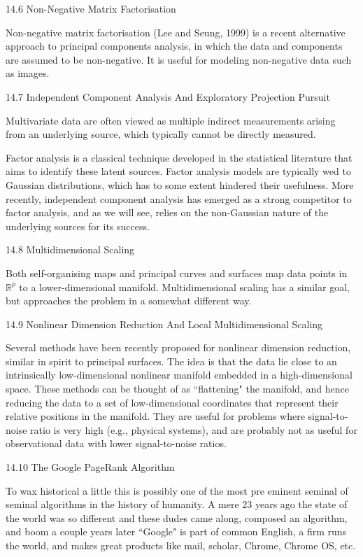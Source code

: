 14.6 Non-Negative Matrix Factorisation

Non-negative matrix factorisation (Lee and Seung, 1999) is a recent alternative approach to principal components analysis, in which the data and components are assumed to be non-negative. It is useful for modeling non-negative data such as images.

14.7 Independent Component Analysis And Exploratory Projection Pursuit

Multivariate data are often viewed as multiple indirect measurements arising from an underlying source, which typically cannot be directly measured.

Factor analysis is a classical technique developed in the statistical literature that aims to identify these latent sources. Factor analysis models are typically wed to Gaussian distributions, which has to some extent hindered their usefulness. More recently, independent component analysis has emerged as a strong competitor to factor analysis, and as we will see, relies on the non-Gaussian nature of the underlying sources for its success.

14.8 Multidimensional Scaling

Both self-organising maps and principal curves and surfaces map data points in $\mathbb{R}^p$ to a lower-dimensional manifold. Multidimensional scaling has a similar goal, but approaches the problem in a somewhat different way.

14.9 Nonlinear Dimension Reduction And Local Multidimensional Scaling

Several methods have been recently proposed for nonlinear dimension reduction, similar in spirit to principal surfaces. The idea is that the data lie close to an intrinsically low-dimensional nonlinear manifold embedded in a high-dimensional space. These methods can be thought of as ``flattening" the manifold, and hence reducing the data to a set of low-dimensional coordinates that represent their relative positions in the manifold. They are useful for problems where signal-to-noise ratio is very high (e.g., physical systems), and are probably not as useful for observational data with lower signal-to-noise ratios.

14.10 The Google PageRank Algorithm

To wax historical a little this is possibly one of the most pre eminent seminal of seminal algorithms in the history of humanity. A mere $23$ years ago the state of the world was so different and these dudes came along, composed an algorithm, and boom a couple years later ``Google" is part of common English, a firm runs the world, and makes great products like mail, scholar, Chrome, Chrome OS, etc.

